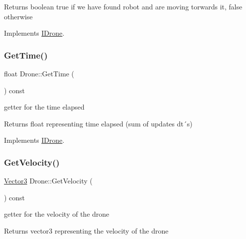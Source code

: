 \begin{DoxyReturn}{Returns}
boolean true if we have found robot and are moving torwards it, false otherwise 
\end{DoxyReturn}


Implements \hyperlink{classIDrone_aed9abde2152408ef3483da57f24c4006}{I\+Drone}.

\mbox{\label{classDrone_a0fde6a9a239da64ae102053c6404fe4d}} 
\subsubsection{\texorpdfstring{Get\+Time()}{GetTime()}}
{\footnotesize\ttfamily float Drone\+::\+Get\+Time (\begin{DoxyParamCaption}{ }\end{DoxyParamCaption}) const\hspace{0.3cm}{\ttfamily [virtual]}}



getter for the time elapsed 

\begin{DoxyReturn}{Returns}
float representing time elapsed (sum of updates dt´s) 
\end{DoxyReturn}


Implements \hyperlink{classIDrone_a18809d1b0626ba66984ef3a91ffb644c}{I\+Drone}.

\mbox{\label{classDrone_ac5adae4a3cbe2e39f577fa7da14407c7}} 
\subsubsection{\texorpdfstring{Get\+Velocity()}{GetVelocity()}}
{\footnotesize\ttfamily \hyperlink{classVector3}{Vector3} Drone\+::\+Get\+Velocity (\begin{DoxyParamCaption}{ }\end{DoxyParamCaption}) const\hspace{0.3cm}{\ttfamily [virtual]}}



getter for the velocity of the drone 

\begin{DoxyReturn}{Returns}
vector3 representing the velocity of the drone 
\end{DoxyReturn}


